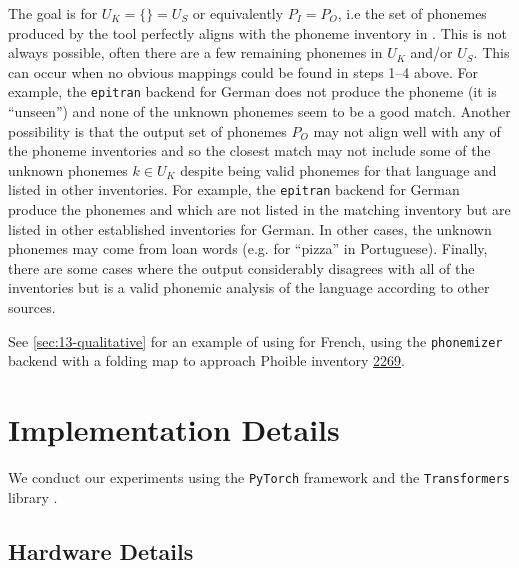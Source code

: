 The goal is for $U_K = \{\} = U_S$ or equivalently $P_I = P_O$, i.e the set of phonemes produced by the tool perfectly aligns with the phoneme inventory in \phoible. This is not always possible, often there are a few remaining phonemes in $U_K$ and/or $U_S$. This can occur when no obvious mappings could be found in steps 1--4 above. For example, the \texttt{epitran} backend for German does not produce the phoneme  (it is ``unseen'') and none of the unknown phonemes seem to be a good match. Another possibility is that the output set of phonemes $P_O$ may not align well with any of the \phoible phoneme inventories and so the closest match may not include some of the unknown phonemes $k \in U_K$ despite being valid phonemes for that language and listed in other inventories. For example, the \texttt{epitran} backend for German produce the phonemes  and  which are not listed in the matching inventory but are listed in other established inventories for German. In other cases, the unknown phonemes may come from loan words (e.g.  for ``pizza'' in Portuguese). Finally, there are some cases where the output considerably disagrees with all of the \phoible inventories but is a valid phonemic analysis of the language according to other sources.

See \cref{sec:13-qualitative} for an example of using \corpusphonemizer for French, using the \texttt{phonemizer} backend with a folding map to approach Phoible inventory \href{https://phoible.org/inventories/view/2269}{2269}.



\section{Implementation Details}\label{sec:13-models}

We conduct our experiments using the \texttt{PyTorch} framework \citep{paszke-etal-2019-pytorch} and the \texttt{Transformers} library \citep{wolf-etal-2020-transformers}.

\subsection{Hardware Details}

